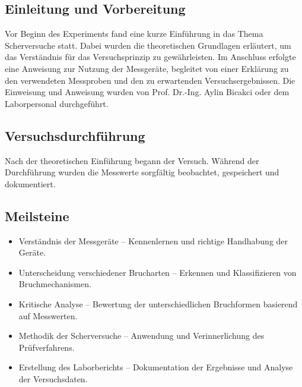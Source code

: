 \subsection{Einleitung und Vorbereitung}
Vor Beginn des Experiments fand eine kurze Einführung in das Thema Scherversuche statt. Dabei wurden die theoretischen Grundlagen erläutert, um das Verständnis für das Versuchsprinzip zu gewährleisten.
Im Anschluss erfolgte eine Anweisung zur Nutzung der Messgeräte, begleitet von einer Erklärung zu den verwendeten Messproben und den zu erwartenden Versuchsergebnissen.
Die Einweisung und Anweisung wurden von Prof. Dr.-Ing. Aylin Bicakci oder dem Laborpersonal durchgeführt.

\subsection{Versuchsdurchführung}
Nach der theoretischen Einführung begann der Versuch. Während der Durchführung wurden die Messwerte sorgfältig beobachtet, gespeichert und dokumentiert.
\subsection{Meilsteine}
\begin{itemize}
    \item Verständnis der Messgeräte – Kennenlernen und richtige Handhabung der Geräte.
    \item Unterscheidung verschiedener Brucharten – Erkennen und Klassifizieren von Bruchmechanismen.
    \item Kritische Analyse – Bewertung der unterschiedlichen Bruchformen basierend auf Messwerten.
    \item Methodik der Scherversuche – Anwendung und Verinnerlichung des Prüfverfahrens.
    \item Erstellung des Laborberichts – Dokumentation der Ergebnisse und Analyse der Versuchsdaten.
\end{itemize}

